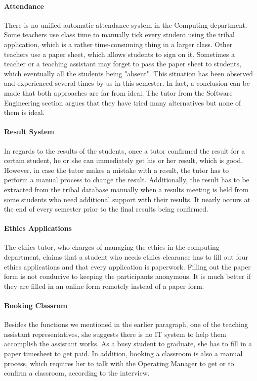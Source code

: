 \paragraph{Attendance}
There is no unified automatic attendance system in the Computing department. Some teachers use class time to manually tick every student using the tribal application, which is a rather time-consuming thing in a larger class. Other teachers use a paper sheet, which allows students to sign on it. Sometimes a teacher or a teaching assistant may forget to pass the paper sheet to students, which eventually all the students being "absent". This situation has been observed and experienced several times by us in this semester. In fact, a conclusion can be made that both approaches are far from ideal. The tutor from the Software Engineering section argues that they have tried many alternatives but none of them is ideal.

\paragraph{Result System}
In regards to the results of the students, once a tutor confirmed the result for a certain student, he or she can immediately get his or her result, which is good. However, in case the tutor makes a mistake with a result, the tutor has to perform a manual process to change the result. Additionally, the result has to be extracted from the tribal database manually when a results meeting is held from some students who need additional support with their results. It nearly occurs at the end of every semester prior to the final results being confirmed. 

\paragraph{Ethics Applications}
The ethics tutor, who charges of managing the ethics in the computing department, claims that a student who needs ethics clearance has to fill out four ethics applications and that every application is paperwork. Filling out the paper form is not conducive to keeping the participants anonymous. It is much better if they are filled in an online form remotely instead of a paper form.

\paragraph{Booking Classrom}
Besides the functions we mentioned in the earlier paragraph, one of the teaching assistant representatives, she suggests there is no IT system to help them accomplish the assistant works. As a busy student to graduate, she has to fill in a paper timesheet to get paid. In addition, booking a classroom is also a manual process, which requires her to talk with the Operating Manager to get or to confirm a classroom, according to the interview.


